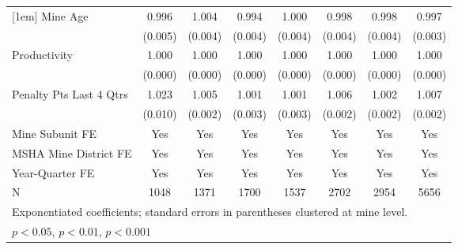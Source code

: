 {\begin{tabular}{l*{7}{c}}
[1em]
Mine Age                 &       0.996         &       1.004         &       0.994         &       1.000         &       0.998         &       0.998         &       0.997         \\
                         &     (0.005)         &     (0.004)         &     (0.004)         &     (0.004)         &     (0.004)         &     (0.004)         &     (0.003)         \\
[1em]
Productivity             &       1.000\sym{*}  &       1.000         &       1.000         &       1.000         &       1.000\sym{*}  &       1.000         &       1.000         \\
                         &     (0.000)         &     (0.000)         &     (0.000)         &     (0.000)         &     (0.000)         &     (0.000)         &     (0.000)         \\
[1em]
Penalty Pts Last 4 Qtrs  &       1.023\sym{*}  &       1.005\sym{*}  &       1.001         &       1.001         &       1.006\sym{**} &       1.002         &       1.007\sym{***}\\
                         &     (0.010)         &     (0.002)         &     (0.003)         &     (0.003)         &     (0.002)         &     (0.002)         &     (0.002)         \\
[1em]
Mine Subunit FE          &         Yes         &         Yes         &         Yes         &         Yes         &         Yes         &         Yes         &         Yes         \\
[1em]
MSHA Mine District FE    &         Yes         &         Yes         &         Yes         &         Yes         &         Yes         &         Yes         &         Yes         \\
[1em]
Year-Quarter FE          &         Yes         &         Yes         &         Yes         &         Yes         &         Yes         &         Yes         &         Yes         \\
\hline
N                        &        1048         &        1371         &        1700         &        1537         &        2702         &        2954         &        5656         \\
\hline\hline
\multicolumn{8}{l}{\footnotesize Exponentiated coefficients; standard errors in parentheses clustered at mine level.}\\
\multicolumn{8}{l}{\footnotesize \sym{*} \(p<0.05\), \sym{**} \(p<0.01\), \sym{***} \(p<0.001\)}\\
\end{tabular}
}
